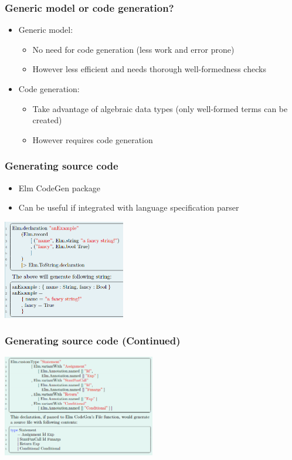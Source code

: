 \documentclass[t,24pt,aspectratio=169]{beamer}
\begin{document}
\begin{frame}[hvid]
    \frametitle{Generic model or code generation?}
    \begin{itemize}
        \item Generic model:
              \begin{itemize}
                  \item No need for code generation (less work and error prone)
                  \item However less efficient and needs thorough well-formedness checks
              \end{itemize}
        \item Code generation:
              \begin{itemize}
                  \item Take advantage of algebraic data types (only well-formed terms can be created)
                  \item However requires code generation
              \end{itemize}
    \end{itemize}
\end{frame}

\begin{frame}[hvid]
    \frametitle{Generating source code}
    \begin{multicols}{2}
        \begin{itemize}
            \item Elm CodeGen package
            \item Can be useful if integrated with language specification parser
        \end{itemize}
        \columnbreak
        \includegraphics[width=0.4\textwidth]{img/codegen-ex.png}
    \end{multicols}
\end{frame}

\begin{frame}[hvid]
    \frametitle{Generating source code (Continued)}
    \begin{center}
        \includegraphics[width=0.5\textwidth]{img/codegen-ex2.png}
    \end{center}
\end{frame}
\end{document}
